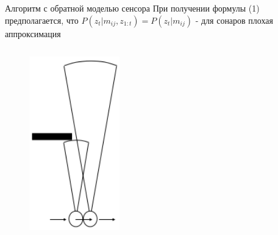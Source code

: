 \documentclass[9pt]{beamer}
\begin{document}
\begin{frame}{Алгоритм с обратной моделью сенсора}
При получении формулы (1) предполагается, что
$P(z_t|m_{ij}, z_{1:t}) = P(z_t|m_{ij})$ - для сонаров плохая аппроксимация

\begin{columns}
\begin{column}{0.33\textwidth}
  \begin{figure}[h]
    \centering
    \includegraphics[width=0.65\textwidth]{inv1.png}
  \end{figure}
\end{column}
\begin{column}{0.33\textwidth}
\begin{figure}[h]
    \centering

\end{figure}
\end{column}
\end{columns}
\end{frame}
\end{document}
